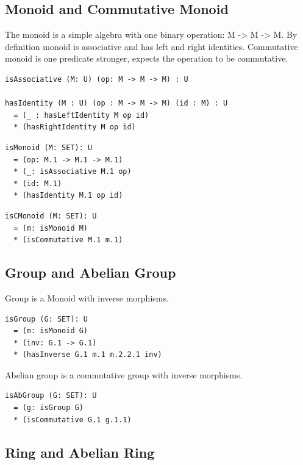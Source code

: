 \documentclass{article}
\begin{document}
\subsection{Monoid and Commutative Monoid}

The monoid is a simple algebra with one binary operation: M -> M -> M.
By definition monoid is associative and has left and right identities.
Commutative monoid is one predicate stronger, expects the operation
to be commutative.

\begin{lstlisting}[mathescape=true]
isAssociative (M: U) (op: M -> M -> M) : U

hasIdentity (M : U) (op : M -> M -> M) (id : M) : U
  = (_ : hasLeftIdentity M op id)
  * (hasRightIdentity M op id)
\end{lstlisting}

\begin{lstlisting}[mathescape=true]
isMonoid (M: SET): U
  = (op: M.1 -> M.1 -> M.1)
  * (_: isAssociative M.1 op)
  * (id: M.1)
  * (hasIdentity M.1 op id)
\end{lstlisting}

\begin{lstlisting}[mathescape=true]
isCMonoid (M: SET): U
  = (m: isMonoid M)
  * (isCommutative M.1 m.1)
\end{lstlisting}

\subsection{Group and Abelian Group}

Group is a Monoid with inverse morphisms.

\begin{lstlisting}[mathescape=true]
isGroup (G: SET): U
  = (m: isMonoid G)
  * (inv: G.1 -> G.1)
  * (hasInverse G.1 m.1 m.2.2.1 inv)
\end{lstlisting}

Abelian group is a commutative group with inverse morphisms.

\begin{lstlisting}[mathescape=true]
isAbGroup (G: SET): U
  = (g: isGroup G)
  * (isCommutative G.1 g.1.1)
\end{lstlisting}

\subsection{Ring and Abelian Ring}
\end{document}
